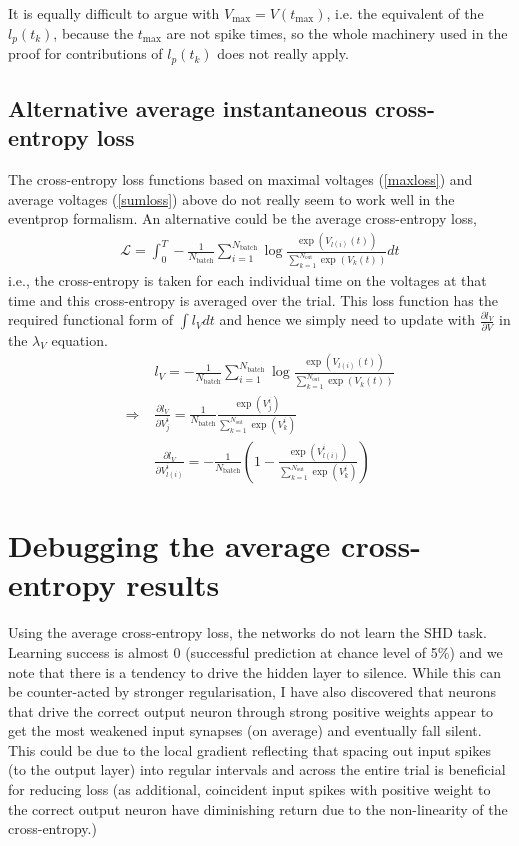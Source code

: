 \documentclass[a4paper]{article}
\begin{document}
 It is equally difficult to argue with
  $V_{\text{max}} = V(t_{\text{max}})$, i.e. the equivalent of the $l_p(t_k)$, because the $t_{\text{max}}$ are not
  spike times, so the whole machinery used in the proof for
  contributions of $l_p(t_k)$ does not really apply.

  \subsection{Alternative average instantaneous cross-entropy loss}
  The cross-entropy loss functions based on maximal voltages (\ref{maxloss}) and
  average voltages (\ref{sumloss}) above do not really seem to work well in the
  eventprop formalism. An alternative could be the average
  cross-entropy loss,
  \begin{align}
    {\mathcal L} = \int_0^T - \frac{1}{N_{\text{batch}}}
    \sum_{i=1}^{N_{\text{batch}}} \log
    \frac{\exp(V_{l(i)}(t))}{\sum_{k=1}^{N_{\text{out}}} \exp(V_k(t))} dt
  \end{align} 
  i.e., the cross-entropy is taken for each individual time on the
  voltages at that time and this cross-entropy is averaged over the
  trial. This loss function has the required functional form of $\int
  l_V dt$ and hence we simply need to update with $\frac{\partial
    l_V}{\partial V}$ in the $\lambda_V$ equation.
  \begin{align}
    & l_V= - \frac{1}{N_{\text{batch}}}
    \sum_{i=1}^{N_{\text{batch}}} \log
    \frac{\exp(V_{l(i)}(t))}{\sum_{k=1}^{N_{\text{out}}} \exp(V_k(t))}
    \\
    \Rightarrow \; & \frac{\partial l_V}{\partial V_j^i} =
    \frac{1}{N_{\text{batch}}}
    \frac{\exp(V_j^i)}{\sum_{k=1}^{N_{\text{out}}} \exp(V_k^i)} \\
    & \frac{\partial l_V}{\partial V_{l(i)}^i} =
    - \frac{1}{N_{\text{batch}}} \left(
    1 - \frac{\exp(V_{l(i)}^i)}{\sum_{k=1}^{N_{\text{out}}}
      \exp(V_k^i)} \right) 
  \end{align}

  \section{Debugging the average cross-entropy results}
  Using the average cross-entropy loss, the networks do not learn the SHD task. Learning success is almost 0 (successful prediction at chance level of 5\%) and we note that there is a tendency to drive the hidden layer to silence. While this can be counter-acted by stronger regularisation, I have also discovered that neurons that drive the correct output neuron through strong positive weights appear to get the most weakened input synapses (on average) and eventually fall silent.
  This could be due to the local gradient reflecting that spacing out input spikes (to the output layer) into regular intervals and across the entire trial is beneficial for reducing loss (as additional, coincident input spikes with positive weight to the correct output neuron have diminishing return due to the non-linearity of the cross-entropy.)
\end{document}
